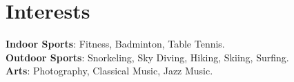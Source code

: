 \documentclass[letterpaper,11pt]{article}
\begin{document}
\section{Interests}
 \begin{itemize}[leftmargin=0.15in, label={}]
    \small{\item{
    \vspace{2pt}
     \textbf{Indoor Sports}{: Fitness, Badminton, Table Tennis.} \\\vspace{3pt}
     \textbf{Outdoor Sports}{: Snorkeling, Sky Diving, Hiking, Skiing, Surfing.} \\\vspace{3pt}
     \textbf{Arts}{: Photography, Classical Music, Jazz Music.}     
    }}
 \end{itemize}

\end{document}
